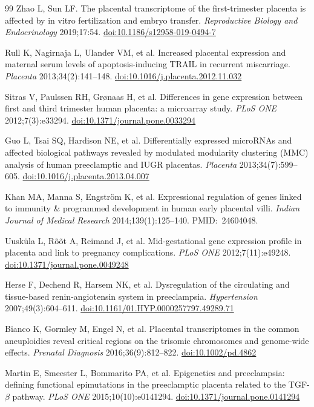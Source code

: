 \documentclass[11pt,a4paper]{article}
\newcommand{\doi}[1]{\href{https://doi.org/#1}{doi:#1}}
\begin{document}
\begin{thebibliography}{99}
Zhao L, Sun LF.
The placental transcriptome of the first-trimester placenta is
affected by in vitro fertilization and embryo transfer.
\textit{Reproductive Biology and Endocrinology} 2019;17:54.
\doi{10.1186/s12958-019-0494-7}

Rull K, Nagirnaja L, Ulander VM, et al.
Increased placental expression and maternal serum levels of
apoptosis-inducing TRAIL in recurrent miscarriage.
\textit{Placenta} 2013;34(2):141--148.
\doi{10.1016/j.placenta.2012.11.032}

Sitras V, Paulssen RH, Gr{\o}naas H, et al.
Differences in gene expression between first and third trimester
human placenta: a microarray study.
\textit{PLoS ONE} 2012;7(3):e33294.
\doi{10.1371/journal.pone.0033294}

Guo L, Tsai SQ, Hardison NE, et al.
Differentially expressed microRNAs and affected biological pathways
revealed by modulated modularity clustering (MMC) analysis of human
preeclamptic and IUGR placentas.
\textit{Placenta} 2013;34(7):599--605.
\doi{10.1016/j.placenta.2013.04.007}

Khan MA, Manna S, Engstr{\"o}m K, et al.
Expressional regulation of genes linked to immunity \&
programmed development in human early placental villi.
\textit{Indian Journal of Medical Research} 2014;139(1):125--140.
PMID:~24604048.

Uusk{\"u}la L, R{\~o}{\~o}t A, Reimand J, et al.
Mid-gestational gene expression profile in placenta and link to
pregnancy complications.
\textit{PLoS ONE} 2012;7(11):e49248.
\doi{10.1371/journal.pone.0049248}


Herse F, Dechend R, Harsem NK, et al.
Dysregulation of the circulating and tissue-based
renin-angiotensin system in preeclampsia.
\textit{Hypertension} 2007;49(3):604--611.
\doi{10.1161/01.HYP.0000257797.49289.71}

Bianco K, Gormley M, Engel N, et al.
Placental transcriptomes in the common aneuploidies reveal
critical regions on the trisomic chromosomes and genome-wide
effects.
\textit{Prenatal Diagnosis} 2016;36(9):812--822.
\doi{10.1002/pd.4862}

Martin E, Smeester L, Bommarito PA, et al.
Epigenetics and preeclampsia: defining functional epimutations in
the preeclamptic placenta related to the TGF-$\beta$ pathway.
\textit{PLoS ONE} 2015;10(10):e0141294.
\doi{10.1371/journal.pone.0141294}


\end{thebibliography}
\end{document}
